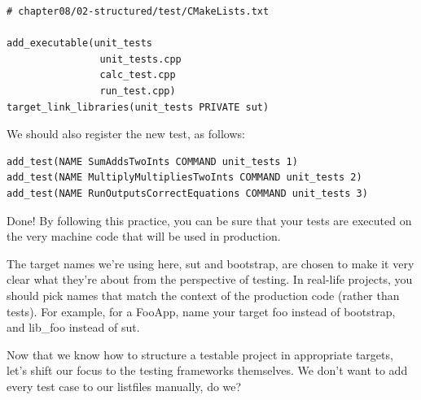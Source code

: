 \begin{lstlisting}[style=styleCMake]
# chapter08/02-structured/test/CMakeLists.txt

add_executable(unit_tests
				unit_tests.cpp
				calc_test.cpp
				run_test.cpp)
target_link_libraries(unit_tests PRIVATE sut)
\end{lstlisting} 

We should also register the new test, as follows:

\begin{lstlisting}[style=styleCMake]
add_test(NAME SumAddsTwoInts COMMAND unit_tests 1)
add_test(NAME MultiplyMultipliesTwoInts COMMAND unit_tests 2)
add_test(NAME RunOutputsCorrectEquations COMMAND unit_tests 3)
\end{lstlisting} 

Done! By following this practice, you can be sure that your tests are executed on the very machine code that will be used in production.

\begin{tcolorbox}[colback=blue!5!white,colframe=blue!75!black,title=Note]
The target names we're using here, sut and bootstrap, are chosen to make it very clear what they're about from the perspective of testing. In real-life projects, you should pick names that match the context of the production code (rather than tests). For example, for a FooApp, name your target foo instead of bootstrap, and lib\_foo instead of sut.
\end{tcolorbox}

Now that we know how to structure a testable project in appropriate targets, let's shift our focus to the testing frameworks themselves. We don't want to add every test case to our listfiles manually, do we?
































